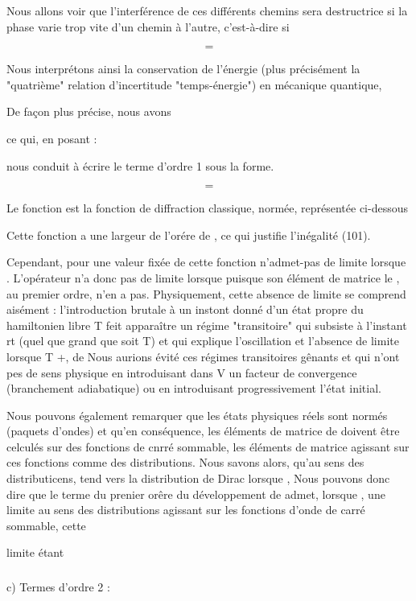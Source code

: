 {{{%
 
Nous allons voir que l'interférence de ces différents
chemins sera destructrice si la phase varie trop vite d'un chemin
à l'autre, c'est-à-dire si

\[
\tag{101}=
\]

Nous interprétons ainsi la conservation de l'énergie
(plus précisément la "quatrième" relation d'incertitude "temps-énergie") en mécanique quantique,

De façon plus précise, nous avons

ce qui, en posant :

nous conduit à écrire le terme d'ordre 1 sous la forme.

\[
\tag{103}=
\]

Le fonction  est la fonction de diffraction classique, normée, représentée ci-dessous

%
Cette fonction a une largeur de l'orére de , ce qui justifie
l'inégalité (101).

Cependant, pour une valeur fixée de cette fonction
n'admet-pas de limite lorsque . L'opérateur  n'a donc
pas de limite lorsque  puisque son élément de matrice
le , au premier ordre, n'en a pas. Physiquement,
cette absence de limite se comprend aisément : l'introduction brutale
à un instont donné  d'un état propre  du hamiltonien libre T
feit apparaître un régime "transitoire" qui subsiste à l'instant rt (quel
que grand que soit T) et qui explique l'oscillation et l'absence de limite
lorsque T +, de  Nous aurions évité ces
régimes transitoires gênants et qui n'ont pes de sens physique en introduisant
dans V un facteur de convergence (branchement adiabatique) ou en
introduisant progressivement l'état initial.

Nous pouvons également remarquer que les états physiques réels
sont normés (paquets d'ondes) et qu'en conséquence, les éléments de matrice
de  doivent être celculés sur des fonctions de cnrré sommable,
les éléments de matrice  agissant sur ces fonctions
comme des distributions. Nous savons alors, qu'au sens des distributicens,
 tend vers la distribution de Dirac  lorsque
, Nous pouvons donc dire que le terme du prenier orêre du développement
de  admet, lorsque  , une limite au sens des
distributions agissant sur les fonctions d'onde de carré sommable, cette

limite étant


\subsubsection{}%
c) Termes d'ordre 2 :

}}}
